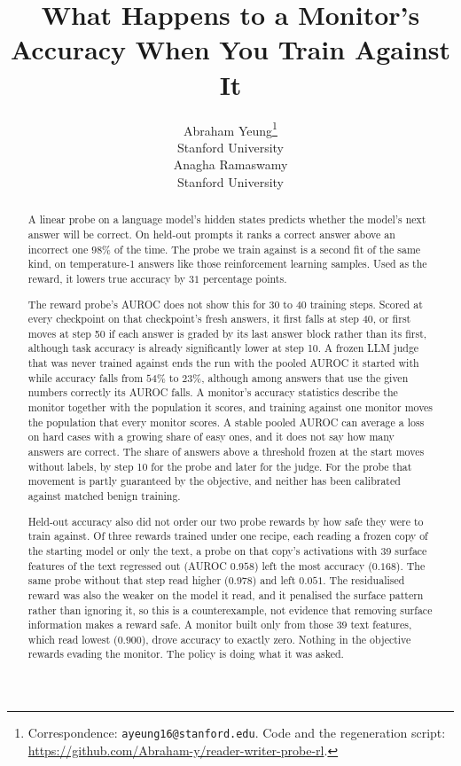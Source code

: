 \documentclass{article}
\title{What Happens to a Monitor's Accuracy When You Train Against It}
\author{%
  Abraham Yeung\thanks{Correspondence: \texttt{ayeung16@stanford.edu}. Code and the regeneration script: \url{https://github.com/Abraham-y/reader-writer-probe-rl}.} \\
  Stanford University \\
  \And
  Anagha Ramaswamy \\
  Stanford University \\
}
\begin{document}
\maketitle

\begin{abstract}

A linear probe on a language model's hidden states predicts whether the model's next answer will be correct. On held-out prompts it ranks a correct answer above an incorrect one $98\%$ of the time. The probe we train against is a second fit of the same kind, on temperature-1 answers like those reinforcement learning samples. Used as the reward, it lowers true accuracy by $31$ percentage points.

The reward probe's AUROC does not show this for 30 to 40 training steps. Scored at every checkpoint on that checkpoint's fresh answers, it first falls at step 40, or first moves at step 50 if each answer is graded by its last answer block rather than its first, although task accuracy is already significantly lower at step 10. A frozen LLM judge that was never trained against ends the run with the pooled AUROC it started with while accuracy falls from $54\%$ to $23\%$, although among answers that use the given numbers correctly its AUROC falls. A monitor's accuracy statistics describe the monitor together with the population it scores, and training against one monitor moves the population that every monitor scores. A stable pooled AUROC can average a loss on hard cases with a growing share of easy ones, and it does not say how many answers are correct. The share of answers above a threshold frozen at the start moves without labels, by step 10 for the probe and later for the judge. For the probe that movement is partly guaranteed by the objective, and neither has been calibrated against matched benign training.

Held-out accuracy also did not order our two probe rewards by how safe they were to train against. Of three rewards trained under one recipe, each reading a frozen copy of the starting model or only the text, a probe on that copy's activations with 39 surface features of the text regressed out (AUROC $0.958$) left the most accuracy ($0.168$). The same probe without that step read higher ($0.978$) and left $0.051$. The residualised reward was also the weaker on the model it read, and it penalised the surface pattern rather than ignoring it, so this is a counterexample, not evidence that removing surface information makes a reward safe. A monitor built only from those 39 text features, which read lowest ($0.900$), drove accuracy to exactly zero. Nothing in the objective rewards evading the monitor. The policy is doing what it was asked.

\end{abstract}
\end{document}
